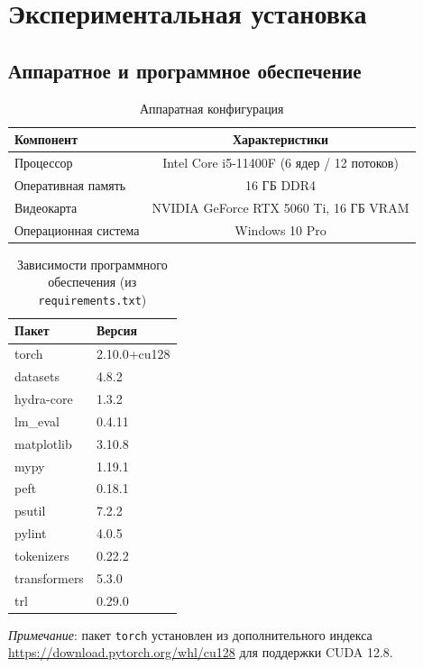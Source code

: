 \documentclass[a4paper,12pt]{article}
\begin{document}
\section{Экспериментальная установка}
\label{sec:experiments}

\subsection{Аппаратное и программное обеспечение}

\begin{table}[H]
\centering
\caption{Аппаратная конфигурация}
\label{tab:hardware}
\begin{tabular}{lc}
\toprule
\textbf{Компонент} & \textbf{Характеристики} \\
\midrule
Процессор & Intel Core i5-11400F (6 ядер / 12 потоков) \\
Оперативная память & 16 ГБ DDR4 \\
Видеокарта & NVIDIA GeForce RTX 5060 Ti, 16 ГБ VRAM \\
Операционная система & Windows 10 Pro \\
\bottomrule
\end{tabular}
\end{table}

\begin{table}[H]
\centering
\caption{Зависимости программного обеспечения (из \texttt{requirements.txt})}
\label{tab:software}
\begin{tabular}{ll}
\toprule
\textbf{Пакет} & \textbf{Версия} \\
\midrule
torch & 2.10.0+cu128 \\
datasets & 4.8.2 \\
hydra-core & 1.3.2 \\
lm\_eval & 0.4.11 \\
matplotlib & 3.10.8 \\
mypy & 1.19.1 \\
peft & 0.18.1 \\
psutil & 7.2.2 \\
pylint & 4.0.5 \\
tokenizers & 0.22.2 \\
transformers & 5.3.0 \\
trl & 0.29.0 \\
\bottomrule
\end{tabular}
\end{table}

\noindent\textit{Примечание}: пакет \texttt{torch} установлен из дополнительного индекса \url{https://download.pytorch.org/whl/cu128} для поддержки CUDA 12.8.
\end{document}
